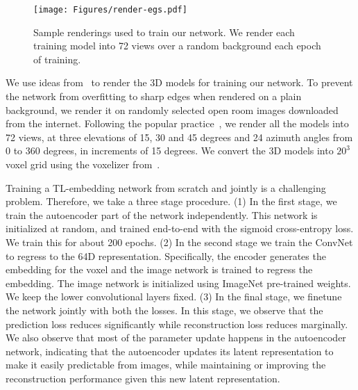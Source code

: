 \documentclass[runningheads]{llncs}
\begin{document}
\begin{figure}[t]
\centering
\texttt{[image: Figures/render-egs.pdf]}
\caption{Sample renderings used to train 
our network.
We render each training model
into 72 views
over a random background each epoch of training.}
\label{fig:render-egs}
\end{figure}
We use ideas from~\cite{Su_2015_ICCV} to render the 3D models for training our
network. To prevent the network from overfitting to sharp edges when rendered
on a plain background, we render it on randomly selected open room images
downloaded from the internet. Following the popular practice~\cite{su15mvcnn},
we render all the models into 72 views, at
three elevations of 15, 30 and 45
degrees and 24 azimuth angles from 0 to 360 degrees, in increments of
15 degrees. We convert the 3D models into $20^3$ voxel
grid using the voxelizer from~\cite{3dshapenet}.

Training a TL-embedding network from scratch
and jointly is a challenging problem. 
Therefore, we take a three stage procedure.
(1) In the first stage, we train the autoencoder part
of the network independently. This network is
initialized at random, and trained end-to-end with the sigmoid cross-entropy
loss. We train this for about 200 epochs. 
(2) In the second stage we train the ConvNet to regress to the 64D representation.
Specifically, the encoder generates the embedding for the voxel and the image
network is trained to regress the embedding.
The image network is initialized using ImageNet pre-trained weights.
We keep the lower convolutional layers fixed.
(3) In the final stage, we finetune the network jointly
with both the losses.
In this stage, we observe that the prediction loss reduces significantly while reconstruction
loss reduces marginally. We also observe that most of 
the parameter update happens in the autoencoder network, indicating that the autoencoder
updates its latent representation to make it easily predictable from images, while maintaining or
improving the reconstruction performance given this new latent representation.
\end{document}
